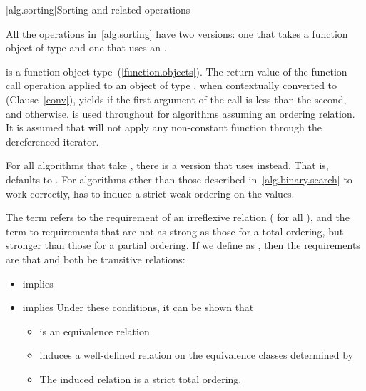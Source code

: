 [alg.sorting]{Sorting and related operations}

\pnum
All the operations in~\ref{alg.sorting} have two versions: one that takes a function object of type
and one that uses an
.

\pnum
{}
is a function object
type~(\ref{function.objects}). The return value of the function call operation applied to
an object of type , when contextually converted to
 (Clause~\ref{conv}),
yields  if the first argument of the call
is less than the second, and
otherwise.
is used throughout for algorithms assuming an ordering relation.
It is assumed that
will not apply any non-constant function through the dereferenced iterator.

\pnum
For all algorithms that take
,
there is a version that uses
instead.
That is,
defaults to
.
For algorithms other than those described in~\ref{alg.binary.search} to work correctly,
 has to induce a strict weak ordering on the values.

\pnum
The term
refers to the
requirement of an irreflexive relation ( for all ),
and the term
to requirements that are not as strong as
those for a total ordering,
but stronger than those for a partial
ordering.
If we define
as
,
then the requirements are that
and
both be transitive  relations:

\begin{itemize}
\item
{}
implies
\item
{}
implies
\enternote
Under these conditions, it can be shown that
\begin{itemize}
\item
{}
is an equivalence relation
\item
{}
induces a well-defined relation on the equivalence
classes determined by
\item
The induced relation is a strict total ordering.
\exitnote
\end{itemize}
\end{itemize}

